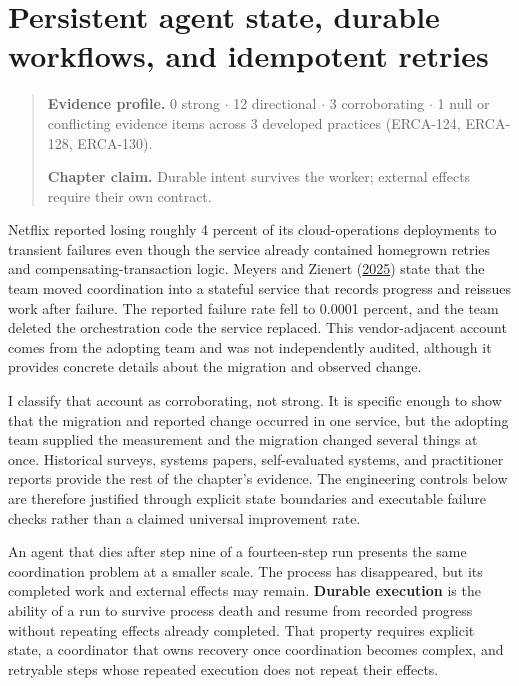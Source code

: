 \chapter{Persistent agent state, durable workflows, and idempotent retries}
\label{ch08-persistent-state-durable-workflows-idempotent-retries}
\begin{quote}
\textbf{Evidence profile.} 0 strong \(\cdot\) 12 directional \(\cdot\) 3 corroborating \(\cdot\) 1 null or conflicting evidence items across 3 developed practices (ERCA-124, ERCA-128, ERCA-130).

\textbf{Chapter claim.} Durable intent survives the worker; external effects require their own contract.
\end{quote}

Netflix reported losing roughly 4 percent of its cloud-operations deployments to transient failures even though the service already contained homegrown retries and compensating-transaction logic. Meyers and Zienert (\href{https://netflixtechblog.com/how-temporal-powers-reliable-cloud-operations-at-netflix-73c69ccb5953}{2025}) state that the team moved coordination into a stateful service that records progress and reissues work after failure. The reported failure rate fell to 0.0001 percent, and the team deleted the orchestration code the service replaced. This vendor-adjacent account comes from the adopting team and was not independently audited, although it provides concrete details about the migration and observed change.

I classify that account as corroborating, not strong. It is specific enough to show that the migration and reported change occurred in one service, but the adopting team supplied the measurement and the migration changed several things at once. Historical surveys, systems papers, self-evaluated systems, and practitioner reports provide the rest of the chapter's evidence. The engineering controls below are therefore justified through explicit state boundaries and executable failure checks rather than a claimed universal improvement rate.

An agent that dies after step nine of a fourteen-step run presents the same coordination problem at a smaller scale. The process has disappeared, but its completed work and external effects may remain. \textbf{Durable execution} is the ability of a run to survive process death and resume from recorded progress without repeating effects already completed. That property requires explicit state, a coordinator that owns recovery once coordination becomes complex, and retryable steps whose repeated execution does not repeat their effects.

